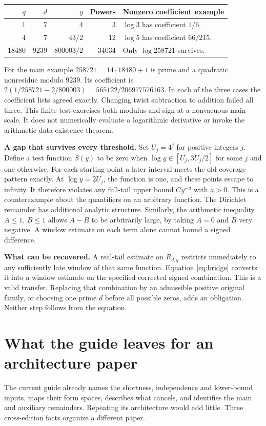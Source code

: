 \documentclass[12pt,letterpaper]{article}
\begin{document}
\begin{center}\small\begin{tabularx}{\linewidth}{@{}rrr r Y@{}}\toprule
$q$ & $d$ & $y$ & Powers & Nonzero coefficient example\\ & 7 & 4 & 3 & $\log3$ has coefficient $1/6$.\\
4 & 7 & $43/2$ & 12 & $\log5$ has coefficient $66/215$.\\
18480 & 9239 & $800003/2$ & 34034 & Only $\log258721$ survives.\\\bottomrule
\end{tabularx}\end{center}
For the main example $258721=14\cdot18480+1$ is prime and a quadratic nonresidue modulo $9239$. Its coefficient is $2(1/258721-2/800003)=565122/206977576163$. In each of the three cases the coefficient lists agreed exactly. Changing twist subtraction to addition failed all three. This finite test exercises both modulus and sign at a nonvacuous main scale. It does not numerically evaluate a logarithmic derivative or invoke the arithmetic data-existence theorem.

\textbf{A gap that survives every threshold.} Set $U_j=4^j$ for positive integers $j$. Define a test function $S(y)$ to be zero when $\log y\in[U_j,3U_j/2]$ for some $j$ and one otherwise. For each starting point a later interval meets the old coverage pattern exactly. At $\log y=2U_j$, the function is one, and these points escape to infinity. It therefore violates any full-tail upper bound $C y^{-a}$ with $a>0$. This is a counterexample about the quantifiers on an arbitrary function. The Dirichlet remainder has additional analytic structure. Similarly, the arithmetic inequality $A\le1$, $B\le1$ allows $A-B$ to be arbitrarily large, by taking $A=0$ and $B$ very negative. A window estimate on each term alone cannot bound a signed difference.

\textbf{What can be recovered.} A real-tail estimate on $R_{d,q}$ restricts immediately to any sufficiently late window of that same function. Equation \eqref{eq:bridge} converts it into a window estimate on the specified corrected signed combination. This is a valid transfer. Replacing that combination by an admissible positive original family, or choosing one prime $d$ before all possible zeros, adds an obligation. Neither step follows from the equation.

\section{What the guide leaves for an architecture paper}
The current guide already names the shortness, independence and lower-bound inputs, maps their form spaces, describes what cancels, and identifies the main and auxiliary remainders. Repeating its architecture would add little. Three cross-edition facts organize a different paper.
\end{document}
